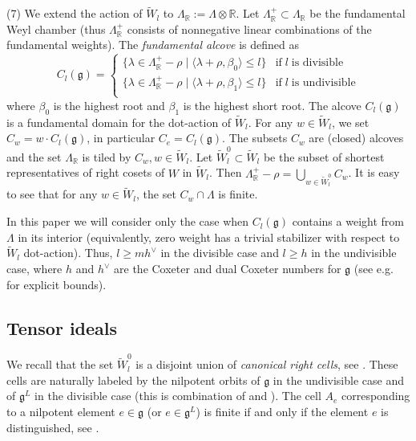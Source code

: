 \documentclass{amsart}
\theoremstyle{definition}
\newcommand{\R}{\mathbb{R}}
\newcommand{\g}{\mathfrak{g}}
\numberwithin{equation}{section}
\begin{document}
(7) We extend the action of $\tilde W_l$ to $\Lambda_\R:=\Lambda \otimes \R$. Let $\Lambda^+_\R \subset \Lambda_\R$ be the fundamental Weyl chamber (thus $\Lambda^+_\R$ consists of nonnegative
linear combinations of the fundamental weights).
The {\em fundamental alcove} is defined as
$$C_l(\g)=\left\{ \begin{array}{cl}\{ \lambda \in \Lambda^+_\R -\rho \;|\; \langle \lambda +\rho, \beta_0\rangle \le l\}&
\mbox{if}\; l\; \mbox{is divisible}\\
\{ \lambda \in \Lambda^+_\R -\rho \;|\; \langle \lambda +\rho, \beta_1\rangle \le l\}&
\mbox{if}\; l\; \mbox{is undivisible}\\
\end{array} \right. $$
where $\beta_0$ is the highest root and $\beta_1$ is the highest short root.
The alcove $C_l(\g)$ is a fundamental domain for the dot-action of $\tilde W_l$. For any
$w\in \tilde W_l$, we set $C_w=w\cdot C_l(\g)$, in particular $C_e=C_l(\g)$. 
The subsets $C_w$ are (closed) alcoves and the set $\Lambda_\R$ is tiled by $C_w, w\in \tilde W_l$.
Let $\tilde W_l^0\subset \tilde W_l$ be the subset of shortest representatives of right cosets of $W$ 
in $\tilde W_l$. Then $\Lambda^+_\R-\rho=\bigcup_{w\in \tilde W_l^0}C_w$. It is easy to see that for any
$w\in \tilde W_l$, the set $C_w\cap \Lambda$ is finite.

In this paper we will consider only the case when $C_l(\g)$ contains a weight from $\Lambda$ in its
interior (equivalently, zero weight has a trivial stabilizer with respect to $\tilde W_l$ dot-action). 
Thus, $l\ge mh^\vee$ in the divisible case and $l\ge h$ in the undivisible case, where $h$ and $h^\vee$ are
the Coxeter and dual Coxeter numbers for $\g$ (see e.g. \cite[Figure 2]{Scho} for explicit bounds).

\subsection{Tensor ideals}\label{t ideal}
We recall that the set $\tilde W_l^0$ is a disjoint union of {\em canonical right cells}, see \cite{LX}. 
These cells are naturally labeled by the nilpotent orbits of $\g$ in the undivisible case and of $\g^L$ in the
divisible case (this is combination of \cite[Theorem 1.2]{LX} and \cite[Theorem 4.8]{Lucells4}).
The cell $A_e$ corresponding to a nilpotent element $e\in \g$ (or $e\in \g^L$) is finite if and only if the element
$e$ is distinguished, see \cite[Theorem 8.1]{Lucells4}. 
\end{document}
